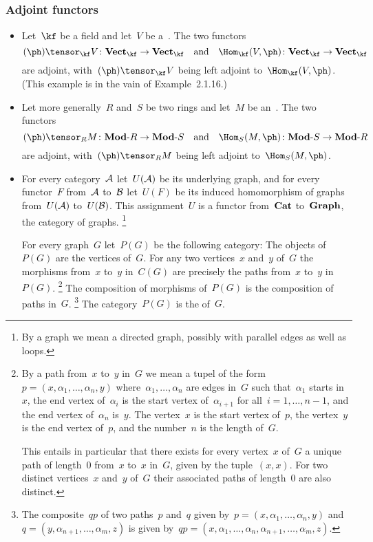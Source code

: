 \subsection{}





\subsubsection*{Adjoint functors}

\begin{itemize}
	\item
		Let~$\kf$ be a field and let~$V$ be a~\vectorspace{$\kf$}.
		The two functors
		\[
			(\ph) \tensor_{\kf} V
			\colon
			\Vect{\kf} \to \Vect{\kf}
			\quad\text{and}\quad
			\Hom_{\kf}(V, \ph)
			\colon
			\Vect{\kf} \to \Vect{\kf}
		\]
		are adjoint, with~$(\ph) \tensor_{\kf} V$ being left adjoint to~$\Hom_{\kf}(V, \ph)$.
		(This example is in the vain of Example~2.1.16.)
	\item
		Let more generally~$R$ and~$S$ be two rings and let~$M$ be an~.
		The two functors
		\[
			(\ph) \tensor_R M
			\colon
			\Modr{R} \to \Modr{S}
			\quad\text{and}\quad
			\Hom_S(M, \ph)
			\colon
			\Modr{S} \to \Modr{R}
		\]
		are adjoint, with~$(\ph) \tensor_R M$ being left adjoint to~$\Hom_S(M, \ph)$.
	\item
		For every category~$\mathcal{A}$ let~$U(\mathcal{A})$ be its underlying graph, and for every functor~$F$ from~$\mathcal{A}$ to~$\mathcal{B}$ let~$U(F)$ be its induced homomorphism of graphs from~$U(\mathcal{A})$ to~$U(\mathcal{B})$.
		This assignment~$U$ is a functor from~$\mathbf{Cat}$ to~$\mathbf{Graph}$, the category of graphs.%
		\footnote{
			By a graph we mean a directed graph, possibly with parallel edges as well as loops.
		}

		For every graph~$G$ let~$P(G)$ be the following category:
		The objects of~$P(G)$ are the vertices of~$G$.
		For any two vertices~$x$ and~$y$ of~$G$ the morphisms from~$x$ to~$y$ in~$C(G)$ are precisely the paths from~$x$ to~$y$ in~$P(G)$.%
		\footnote{
			By a path from~$x$ to~$y$ in~$G$ we mean a tupel of the form~$p = (x, α_1, \dotsc, α_n, y)$ where~$α_1, \dotsc, α_n$ are edges in~$G$ such that~$α_1$ starts in~$x$, the end vertex of~$α_i$ is the start vertex of~$α_{i+1}$ for all~$i = 1, \dotsc, n - 1$, and the end vertex of~$α_n$ is~$y$.
			The vertex~$x$ is the start vertex of~$p$, the vertex~$y$ is the end vertex of~$p$, and the number~$n$ is the length of~$G$.

			This entails in particular that there exists for every vertex~$x$ of~$G$ a unique path of length~$0$ from~$x$ to~$x$ in~$G$, given by the tuple~$(x, x)$.
			For two distinct vertices~$x$ and~$y$ of~$G$ their associated paths of length~$0$ are also distinct.
		}
		The composition of morphisms of~$P(G)$ is the composition of paths in~$G$.%
		\footnote{
			The composite~$qp$ of two paths~$p$ and~$q$ given by~$p = (x, α_1, \dotsc, α_n, y)$ and~$q = (y, α_{n+1}, \dotsc, α_m, z)$ is given by~$q p = (x, α_1, \dotsc, α_n, α_{n+1}, \dotsc, α_m, z)$.
		}
		The category~$P(G)$ is the  of~$G$.


\end{itemize}
